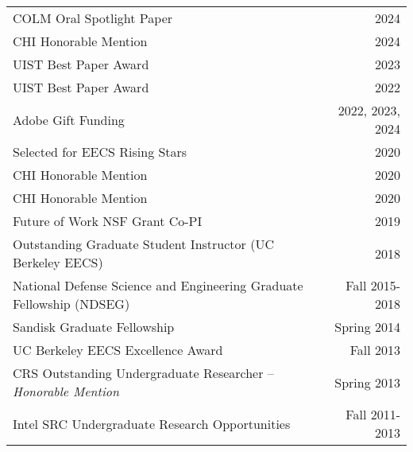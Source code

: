 \begin{longtable}{Xr}
	COLM Oral Spotlight Paper & 2024 \\
	CHI Honorable Mention & 2024 \\
	UIST Best Paper Award & 2023 \\
	UIST Best Paper Award & 2022 \\
	Adobe Gift Funding & 2022, 2023, 2024 \\
	Selected for EECS Rising Stars & 2020 \\
	CHI Honorable Mention & 2020 \\
	CHI Honorable Mention & 2020 \\
	Future of Work NSF Grant Co-PI & 2019 \\
	Outstanding Graduate Student Instructor (UC Berkeley EECS) & 2018 \\
	National Defense Science and Engineering Graduate Fellowship (NDSEG) & Fall 2015-2018 \\
	Sandisk Graduate Fellowship & Spring 2014 \\
	UC Berkeley EECS Excellence Award & Fall 2013 \\
	CRS Outstanding Undergraduate Researcher -- \textit{Honorable Mention} & Spring 2013 \\
	Intel SRC Undergraduate Research Opportunities & Fall 2011-2013 \\
\end{longtable}